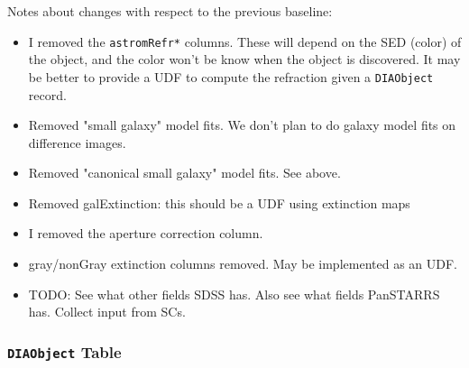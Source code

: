 \documentclass[12pt]{article}
\newcommand{\code}[1]{\texttt{#1}}
\newcommand{\DIAObject}{\code{DIAObject}\xspace}
\begin{document}
\begin{changelog}
Notes about changes with respect to the previous baseline:
\begin{itemize}
\item I removed the \texttt{astromRefr*} columns. These will depend on the SED (color) of the object, and the color won't be know when the object is discovered. It may be better to provide a UDF to compute the refraction given a \DIAObject record.
\item Removed "small galaxy" model fits. We don't plan to do galaxy model fits on difference images.
\item Removed "canonical small galaxy" model fits. See above.
\item Removed galExtinction: this should be a UDF using extinction maps
\item I removed the aperture correction column.
\item gray/nonGray extinction columns removed. May be implemented as an UDF.
\item TODO: See what other fields SDSS has. Also see what fields PanSTARRS has. Collect input from SCs.
\end{itemize}
\end{changelog}

\subsubsection{\DIAObject Table}
\end{document}
